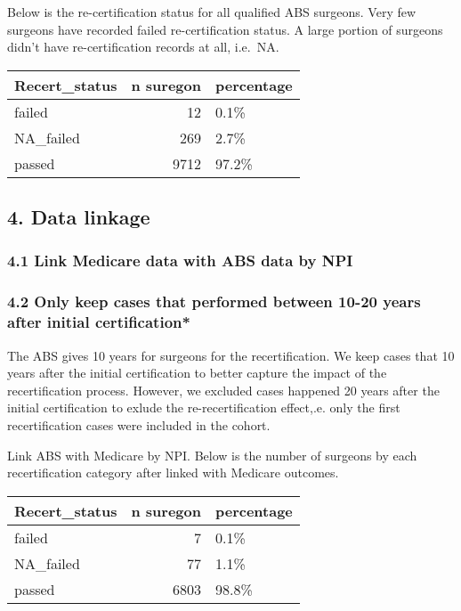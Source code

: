 \documentclass[
]{article}
\begin{document}
Below is the re-certification status for all qualified ABS surgeons.
Very few surgeons have recorded failed re-certification status. A large
portion of surgeons didn't have re-certification records at all,
i.e.~NA.

\begin{table}[H]
\centering
\begin{tabular}{l|r|l}
\hline
Recert\_status & n suregon & percentage\\
\hline
failed & 12 & 0.1\%\\
\hline
NA\_failed & 269 & 2.7\%\\
\hline
passed & 9712 & 97.2\%\\
\hline
\end{tabular}
\end{table}

\hypertarget{data-linkage}{%
\subsection{4. Data linkage}\label{data-linkage}}

\hypertarget{link-medicare-data-with-abs-data-by-npi}{%
\subsubsection{4.1 Link Medicare data with ABS data by
NPI}\label{link-medicare-data-with-abs-data-by-npi}}

\hypertarget{only-keep-cases-that-performed-between-10-20-years-after-initial-certification}{%
\subsubsection{4.2 Only keep cases that performed between 10-20 years
after initial
certification*}\label{only-keep-cases-that-performed-between-10-20-years-after-initial-certification}}

The ABS gives 10 years for surgeons for the recertification. We keep
cases that 10 years after the initial certification to better capture
the impact of the recertification process. However, we excluded cases
happened 20 years after the initial certification to exlude the
re-recertification effect,.e. only the first recertification cases were
included in the cohort.

Link ABS with Medicare by NPI. Below is the number of surgeons by each
recertification category after linked with Medicare outcomes.

\begin{table}[H]
\centering
\begin{tabular}{l|r|l}
\hline
Recert\_status & n suregon & percentage\\
\hline
failed & 7 & 0.1\%\\
\hline
NA\_failed & 77 & 1.1\%\\
\hline
passed & 6803 & 98.8\%\\
\hline
\end{tabular}
\end{table}
\end{document}
